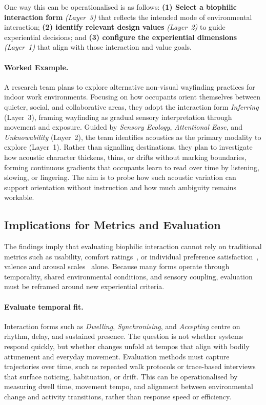 One way this can be operationalised is as follows: \textbf{(1) Select a biophilic interaction form} \emph{(Layer~3)} that reflects the intended mode of environmental interaction; \textbf{(2) identify relevant design values} \emph{(Layer~2)} to guide experiential decisions; and \textbf{(3) configure the experiential dimensions} \emph{(Layer~1)} that align with those interaction and value goals.



\paragraph{Worked Example.}
A research team plans to explore alternative non-visual wayfinding practices for indoor work environments. Focusing on how occupants orient themselves between quieter, social, and collaborative areas, they adopt the interaction form \emph{Inferring} (Layer~3), framing wayfinding as gradual sensory interpretation through movement and exposure. Guided by \emph{Sensory Ecology}, \emph{Attentional Ease}, and \emph{Unknowability} (Layer~2), the team identifies acoustics as the primary modality to explore (Layer~1). Rather than signalling destinations, they plan to investigate how acoustic character thickens, thins, or drifts without marking boundaries, forming continuous gradients that occupants learn to read over time by listening, slowing, or lingering. The aim is to probe how such acoustic variation can support orientation without instruction and how much ambiguity remains workable.


\subsection{Implications for Metrics and Evaluation}
\label{subsec:ch5-evaluation}
The findings imply that evaluating biophilic interaction cannot rely on traditional metrics such as usability, comfort ratings~\cite{alavi2019introduction, alavi2017comfort}, or individual preference satisfaction~\cite{abdalla2016decision}, valence and arousal scales~\cite{lottridge2011affective} alone. Because many forms operate through temporality, shared environmental conditions, and sensory coupling, evaluation must be reframed around new experiential criteria.

\paragraph{Evaluate temporal fit.}
Interaction forms such as \emph{Dwelling}, \emph{Synchronising}, and \emph{Accepting} centre on rhythm, delay, and sustained presence. The question is not whether systems respond quickly, but whether changes unfold at tempos that align with bodily attunement and everyday movement. Evaluation methods must capture trajectories over time, such as repeated walk protocols or trace-based interviews that surface noticing, habituation, or drift. This can be operationalised by measuring dwell time, movement tempo, and alignment between environmental change and activity transitions, rather than response speed or efficiency.

